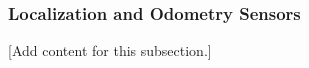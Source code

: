 
\subsubsection{Localization and Odometry Sensors}
\label{subsubsec:design_6_3_localization_odometry_sensors}

[Add content for this subsection.]
